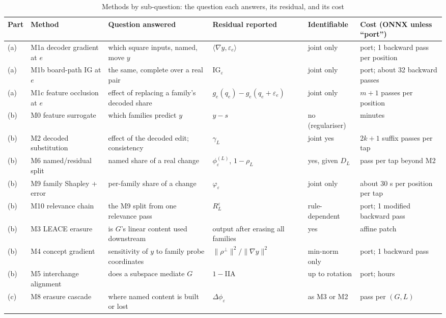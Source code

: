 \documentclass[conference]{IEEEtran}
\begin{document}
\begin{table}[!t]
\centering
\renewcommand{\thetable}{A}
\caption{Methods by sub-question: the question each answers, its residual, and its cost}
\label{tab:A}
\footnotesize
\begin{tabularx}{\textwidth}{l>{\raggedright\arraybackslash}p{2.2cm}>{\raggedright\arraybackslash}X>{\raggedright\arraybackslash}p{3.2cm}>{\raggedright\arraybackslash}p{1.8cm}>{\raggedright\arraybackslash}p{2.6cm}}
\toprule
Part & Method & Question answered & Residual reported & Identifiable & Cost (ONNX unless ``port'') \\
\midrule
(a) & M1a decoder gradient at $e$ & which square inputs, named, move $y$ & $\langle\nabla y,\varepsilon_e\rangle$ & joint only & port; 1 backward pass per position \\
(a) & M1b board-path IG at $e$ & the same, complete over a real pair & $\mathrm{IG}_\varepsilon$ & joint only & port; about 32 backward passes \\
(a) & M1c feature occlusion at $e$ & effect of replacing a family's decoded share & $g_e(q_e)-g_e(q_e+\varepsilon_e)$ & joint only & $m{+}1$ passes per position \\
(b) & M0 feature surrogate & which families predict $y$ & $y-s$ & no (regulariser) & minutes \\
(b) & M2 decoded substitution & effect of the decoded edit; consistency & $\gamma_L$ & joint yes & $2k{+}1$ suffix passes per tap \\
(b) & M6 named/\allowbreak{}residual split & named share of a real change & $\phi^{(L)}_\varepsilon$, $1-\rho_L$ & yes, given $D_L$ & 1 pass per tap beyond M2 \\
(b) & M9 family Shapley + error & per-family share of a change & $\varphi_\varepsilon$ & joint only & about 30 s per position per tap \\
(b) & M10 relevance chain & the M9 split from one relevance pass & $R^\varepsilon_L$ & rule-dependent & port; 1 modified backward pass \\
(b) & M3 LEACE erasure & is $G$'s linear content used downstream & output after erasing all families & yes & 1 affine patch \\
(b) & M4 concept gradient & sensitivity of $y$ to family probe coordinates & $\|\rho^\perp\|^2/\|\nabla y\|^2$ & min-norm only & port; 1 backward pass \\
(b) & M5 interchange alignment & does a subspace mediate $G$ & $1-$IIA & up to rotation & port; hours \\
(c) & M8 erasure cascade & where named content is built or lost & $\Delta\phi_\varepsilon$ & as M3 or M2 & 1 pass per $(G,L)$ \\

\end{tabularx}
\end{table}
\end{document}
